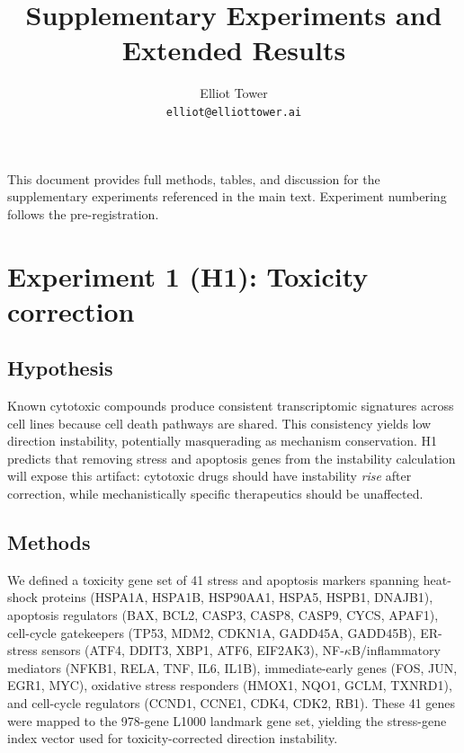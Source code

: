 \documentclass[11pt]{article}
\title{Supplementary Experiments and Extended Results}
\author{Elliot Tower\\
\texttt{elliot@elliottower.ai}}
\date{}
\begin{document}
\maketitle

This document provides full methods, tables, and discussion for the
supplementary experiments referenced in the main text. Experiment
numbering follows the pre-registration.

\tableofcontents
\newpage

\section{Experiment 1 (H1): Toxicity correction}
\label{sec:h1}

\subsection{Hypothesis}

Known cytotoxic compounds produce consistent transcriptomic signatures
across cell lines because cell death pathways are shared.  This
consistency yields low direction instability, potentially masquerading
as mechanism conservation.  H1 predicts that removing stress and
apoptosis genes from the instability calculation will expose this
artifact: cytotoxic drugs should have instability \emph{rise} after
correction, while mechanistically specific therapeutics should be
unaffected.

\subsection{Methods}

We defined a toxicity gene set of 41 stress and apoptosis markers
spanning heat-shock proteins (HSPA1A, HSPA1B, HSP90AA1, HSPA5, HSPB1,
DNAJB1), apoptosis regulators (BAX, BCL2, CASP3, CASP8, CASP9, CYCS,
APAF1), cell-cycle gatekeepers (TP53, MDM2, CDKN1A, GADD45A, GADD45B),
ER-stress sensors (ATF4, DDIT3, XBP1, ATF6, EIF2AK3),
NF-$\kappa$B\slash inflammatory mediators (NFKB1, RELA, TNF, IL6,
IL1B), immediate-early genes (FOS, JUN, EGR1, MYC), oxidative stress
responders (HMOX1, NQO1, GCLM, TXNRD1), and cell-cycle regulators
(CCND1, CCNE1, CDK4, CDK2, RB1).  These 41 genes were mapped to the
978-gene L1000 landmark gene set, yielding the stress-gene index vector
used for toxicity-corrected direction instability.
\end{document}
